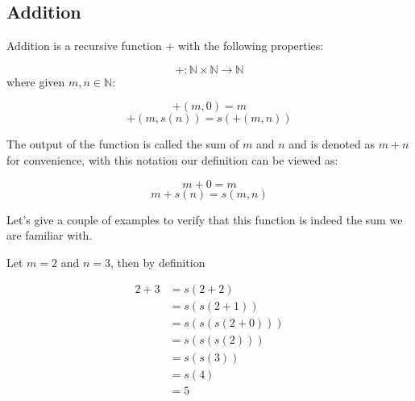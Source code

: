 \documentclass{report}
\begin{document}
    \subsection*{Addition}

    Addition is a recursive function $+$ with the following properties:

    $$+: \mathbb{N}\times \mathbb{N} \to \mathbb{N}$$ where given $m,n \in \mathbb{N}$:

    $$+(m,0) = m$$
    $$+(m,s(n)) = s(+(m,n))$$

    The output of the function is called the sum of $m$ and $n$ and is denoted as $m+n$ for convenience, with this notation our definition can be viewed as:

    $$m+0 = m$$
    $$m + s(n) = s(m, n)$$

    Let's give a couple of examples to verify that this function is indeed the sum we are familiar with.

    \begin{Example}
        Let $m=2$ and $n=3$, then by definition

        \begin{align*}
            2+3 &= s(2+2)\\
            &= s(s(2+1))\\
            &= s(s(s(2+0)))\\
            &= s(s(s(2)))\\
            &= s(s(3))\\
            &= s(4)\\
            &= 5
        \end{align*}
    \end{Example}
\end{document}
